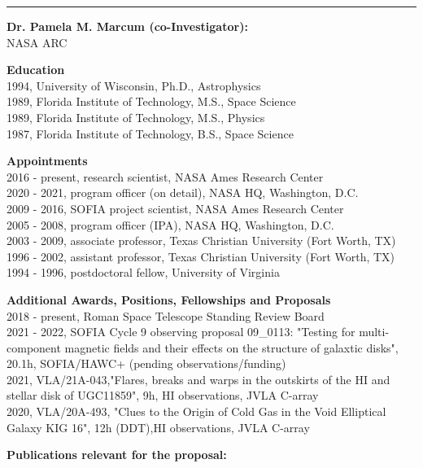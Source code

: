 \medskip \hrule \vspace{5pt} \medskip
\textbf{\color{Blue}\large Dr. Pamela M. Marcum (co-Investigator):}\\
NASA ARC
\par \vspace{-0.5em}
\textbf{Education}\\
1994, University of Wisconsin, Ph.D., Astrophysics\\
1989, Florida Institute of Technology, M.S., Space Science\\
1989, Florida Institute of Technology, M.S., Physics\\
1987, Florida Institute of Technology, B.S., Space Science
\par \vspace{-0.5em}
\textbf{Appointments}\\
2016 - present, research scientist, NASA Ames Research Center\\
2020 - 2021, program officer (on detail), NASA HQ, Washington, D.C.\\
2009 - 2016, SOFIA project scientist, NASA Ames Research Center\\
2005 - 2008, program officer (IPA), NASA HQ, Washington, D.C.\\
2003 - 2009, associate professor, Texas Christian University (Fort Worth, TX)\\
1996 - 2002, assistant professor, Texas Christian University (Fort Worth, TX)\\
1994 - 1996, postdoctoral fellow, University of Virginia
\par \vspace{-0.5em}
\textbf{Additional Awards, Positions, Fellowships and Proposals}\\
2018 - present, Roman Space Telescope Standing Review Board\\
2021 - 2022, SOFIA Cycle 9 observing proposal 09\_0113: "Testing for multi-component magnetic fields and their effects on the structure of galaxtic disks", 20.1h, SOFIA/HAWC+ (pending observations/funding)\\
2021, VLA/21A-043,"Flares, breaks and warps in the outskirts of the HI and stellar disk of UGC11859", 9h, HI observations, JVLA C-array\\
2020, VLA/20A-493, "Clues to the Origin of Cold Gas in the Void Elliptical Galaxy KIG 16", 12h (DDT),HI observations, JVLA C-array
\par \vspace{-0.5em}
\textbf{Publications relevant for the proposal:}\\
